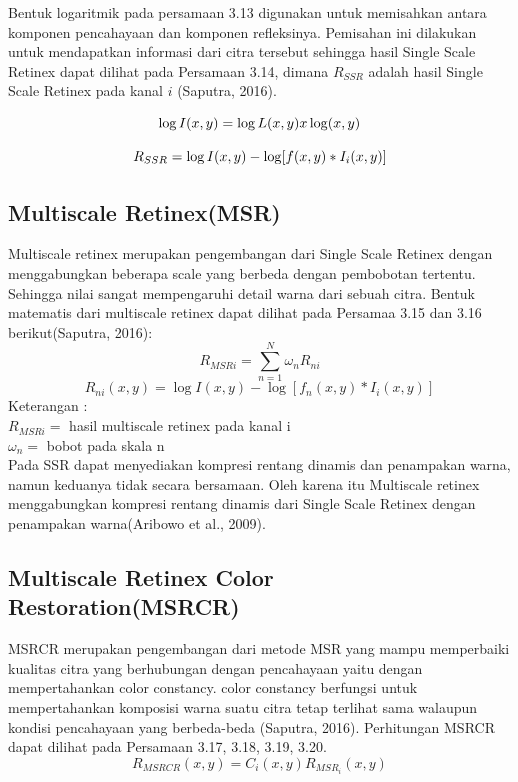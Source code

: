 Bentuk logaritmik pada persamaan 3.13 digunakan untuk memisahkan antara komponen pencahayaan dan komponen refleksinya. Pemisahan ini dilakukan untuk mendapatkan informasi dari citra tersebut sehingga hasil Single Scale Retinex dapat dilihat pada Persamaan 3.14, dimana \(R_{SSR}\) adalah hasil Single Scale Retinex pada kanal \(i\) (Saputra, 2016).

\begin{equation}
\centering
	\log I(x,y) = \log L(x,y)  x  \log(x,y)
\end{equation}

\begin{equation}
\centering
R_{SSR} = \log I(x,y) - \log [f(x,y)* I_i(x,y)]
\end{equation}
\subsection{Multiscale Retinex(MSR)}
Multiscale retinex merupakan pengembangan dari Single Scale Retinex dengan menggabungkan beberapa scale  yang berbeda dengan pembobotan tertentu. Sehingga nilai  sangat mempengaruhi detail warna dari sebuah citra. Bentuk matematis dari multiscale retinex dapat dilihat pada Persamaa 3.15 dan 3.16 berikut(Saputra, 2016):
\begin{equation}
R_{MSRi} = \sum_{n=1}^{N} \omega_n R_{ni}
\end{equation}
\begin{equation}
R_{ni}(x,y) = \log I(x,y) - \log [f_n(x,y)* I_i(x,y)]
\end{equation}
Keterangan :
\\
\(R_{MSRi} = \) hasil multiscale retinex pada kanal i
\\
\(\omega_n = \) bobot pada skala n\\
Pada SSR dapat menyediakan kompresi rentang dinamis dan penampakan warna, namun keduanya tidak secara bersamaan. Oleh karena itu Multiscale retinex menggabungkan kompresi rentang dinamis dari Single Scale Retinex dengan penampakan warna(Aribowo et al., 2009).
\subsection{Multiscale Retinex Color Restoration(MSRCR)}
MSRCR merupakan pengembangan dari metode MSR yang mampu memperbaiki kualitas citra yang berhubungan dengan pencahayaan yaitu dengan mempertahankan color constancy. color constancy berfungsi untuk mempertahankan komposisi warna suatu citra tetap terlihat sama walaupun kondisi pencahayaan yang berbeda-beda (Saputra, 2016). Perhitungan MSRCR dapat dilihat pada Persamaan 3.17, 3.18, 3.19, 3.20.
\begin{equation}
	R_{MSRCR}(x,y) = C_i(x,y) R_{MSR_i}(x,y)	
\end{equation}

